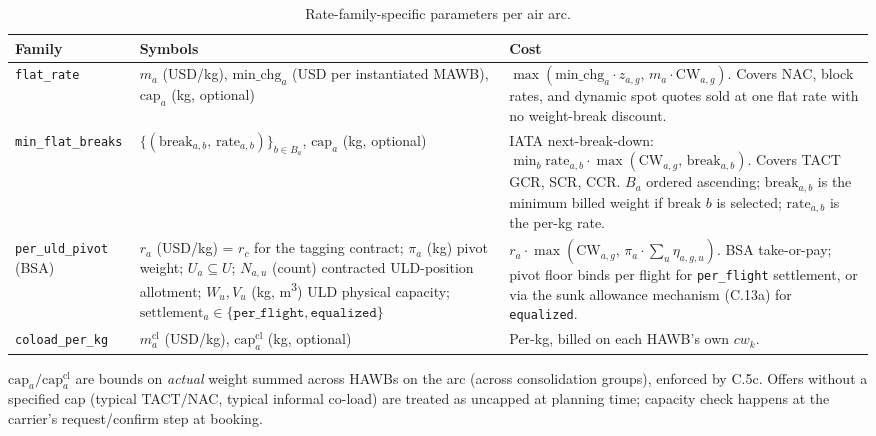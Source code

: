 \documentclass[11pt,a4paper]{article}
\theoremstyle{definition}
\begin{document}
\begin{table}[H]
\centering
\caption{Rate-family-specific parameters per air arc.}
\label{tab:rate-family-params}
\begin{tabular}{lp{4.6cm}p{6.5cm}}
\toprule
Family & Symbols & Cost \\
\midrule
\texttt{flat\_rate} & $m_a$ (USD/kg), $\text{min\_chg}_a$ (USD per instantiated MAWB), $\text{cap}_a$ (kg, optional) & $\max(\text{min\_chg}_a \cdot z_{a,g},\, m_a \cdot \text{CW}_{a,g})$. Covers NAC, block rates, and dynamic spot quotes sold at one flat rate with no weight-break discount. \\[0.3em]
\texttt{min\_flat\_breaks} & $\{(\text{break}_{a,b},\, \text{rate}_{a,b})\}_{b \in B_a}$, $\text{cap}_a$ (kg, optional) & IATA next-break-down: $\min_b \text{rate}_{a,b} \cdot \max(\text{CW}_{a,g},\, \text{break}_{a,b})$. Covers TACT GCR, SCR, CCR. $B_a$ ordered ascending; $\text{break}_{a,b}$ is the minimum billed weight if break $b$ is selected; $\text{rate}_{a,b}$ is the per-kg rate. \\[0.3em]
\texttt{per\_uld\_pivot} (BSA) & $r_a$ (USD/kg) = $r_c$ for the tagging contract; $\pi_a$ (kg) pivot weight; $U_a \subseteq U$; $N_{a,u}$ (count) contracted ULD-position allotment; $W_u, V_u$ (kg, m\textsuperscript{3}) ULD physical capacity; $\text{settlement}_a \in \{\texttt{per\_flight}, \texttt{equalized}\}$ & $r_a \cdot \max(\text{CW}_{a,g},\, \pi_a \cdot \sum_u \eta_{a,g,u})$. BSA take-or-pay; pivot floor binds per flight for \texttt{per\_flight} settlement, or via the sunk allowance mechanism (C.13a) for \texttt{equalized}. \\[0.3em]
\texttt{coload\_per\_kg} & $m_a^{\text{cl}}$ (USD/kg), $\text{cap}_a^{\text{cl}}$ (kg, optional) & Per-kg, billed on each HAWB's own $cw_k$. \\
\bottomrule
\end{tabular}
\end{table}

$\text{cap}_a / \text{cap}_a^{\text{cl}}$ are bounds on \emph{actual} weight
summed across HAWBs on the arc (across consolidation groups), enforced by
C.5c. Offers without a specified cap (typical TACT/NAC, typical informal
co-load) are treated as uncapped at planning time; capacity check happens at
the carrier's request/confirm step at booking.
\end{document}
